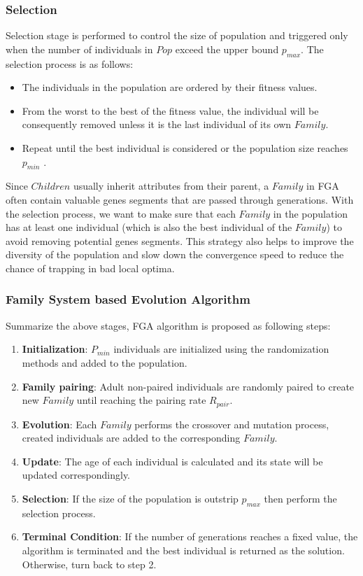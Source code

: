\documentclass[final]{elsarticle}
\begin{document}
\subsubsection{Selection}

Selection stage is performed to control the size of population and triggered only when the number of individuals in $Pop$ exceed the upper bound $p_{max}$. The selection process is as follows: 
\begin{itemize}
	\item The individuals in the population are ordered by their fitness values. 
	\item From the worst to the best of the fitness value, the individual will be consequently removed unless it is the last individual of its own $ Family $. 
	\item Repeat until the best individual is considered or the population size reaches $p_{min}$ .
\end{itemize}
Since $Children$ usually inherit attributes from their parent, a $Family$ in FGA often contain valuable genes segments that are passed through generations. With the selection process, we want to make sure that each $ Family $ in the population has at least one individual (which is also the best individual of the $ Family $) to avoid removing potential genes segments. This strategy also helps to improve the diversity of the population and slow down the convergence speed to reduce the chance of trapping in bad local optima.

\subsubsection{Family System based Evolution Algorithm}

Summarize the above stages, FGA algorithm is proposed as following steps:

\begin{enumerate}
	\item \textbf{Initialization}: $P_{min}$ individuals are initialized using the randomization methods and added to the population.
	\item \textbf{Family pairing}: Adult non-paired individuals are randomly paired to create new $ Family $ until reaching the pairing rate $R_{pair}$.
	\item \textbf{Evolution}: Each $ Family $ performs the crossover and mutation process, created individuals are added to the corresponding $ Family $.
	\item \textbf{Update}: The age of each individual is calculated and its state will be updated correspondingly.
	\item \textbf{Selection}: If the size of the population is outstrip $p_{max}$ then perform the selection process.
	\item \textbf{Terminal Condition}: If the number of generations reaches a fixed value, the algorithm is terminated and the best individual is returned as the solution. Otherwise, turn back to step 2.
\end{enumerate}
\end{document}

